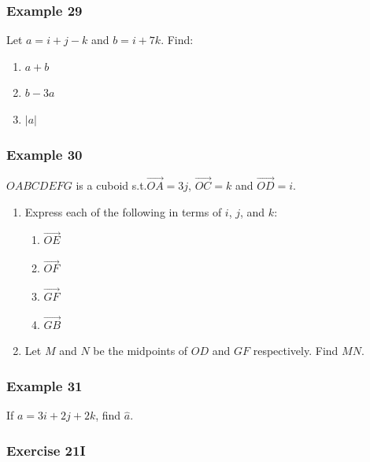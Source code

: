 \documentclass[
	11pt, %
]{beamer}
\newcommand{\blank}{\begin{frame}\end{frame}}
\begin{document}
\begin{frame}[t]
    \frametitle{Example 29}
    Let $a = i + j - k$ and $b = i + 7k$. Find:\\
    \begin{enumerate}
        \item $a + b$
        \item $b-3a$
        \item $|a|$
    \end{enumerate}
\end{frame}

\begin{frame}[t]
    \frametitle{Example 30}
    $OABCDEFG$ is a cuboid s.t.$\vec{OA} = 3j$, $\vec{OC} = k$ and $\vec{OD} = i$.\\
    \begin{enumerate}
        \item Express each of the following in terms of $i$, $j$, and $k$:
        \begin{enumerate}
            \item $\vec{OE}$
            \item $\vec{OF}$
            \item $\vec{GF}$
            \item $\vec{GB}$
        \end{enumerate}
        \item Let $M$ and $N$ be the midpoints of $OD$ and $GF$ respectively. Find $MN$.
    \end{enumerate}
\end{frame}
\blank

\begin{frame}[t]
    \frametitle{Example 31}
    If $a = 3i + 2j + 2k$, find $\hat{a}$.
\end{frame}

\begin{frame}
    \frametitle{Exercise 21I}
\end{frame}
\end{document}
